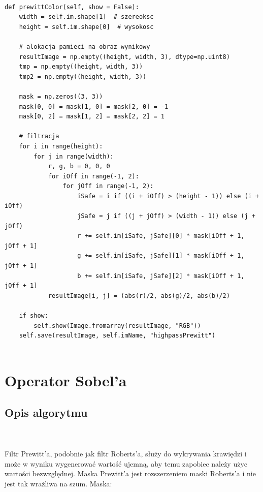 \documentclass[final,a4paper,openany,12pt]{mwbk}
\begin{document}
\newpage


\begin{lstlisting}[caption=Operator Prewitt'a (obraz barwny)]
	
def prewittColor(self, show = False):
	width = self.im.shape[1]  # szereoksc
	height = self.im.shape[0]  # wysokosc
	
	# alokacja pamieci na obraz wynikowy
	resultImage = np.empty((height, width, 3), dtype=np.uint8)
	tmp = np.empty((height, width, 3))
	tmp2 = np.empty((height, width, 3))
	
	mask = np.zeros((3, 3))
	mask[0, 0] = mask[1, 0] = mask[2, 0] = -1
	mask[0, 2] = mask[1, 2] = mask[2, 2] = 1
	
	# filtracja
	for i in range(height):
		for j in range(width):
			r, g, b = 0, 0, 0
			for iOff in range(-1, 2):
				for jOff in range(-1, 2):
					iSafe = i if ((i + iOff) > (height - 1)) else (i + iOff)
					jSafe = j if ((j + jOff) > (width - 1)) else (j + jOff)
					r += self.im[iSafe, jSafe][0] * mask[iOff + 1, jOff + 1]
					g += self.im[iSafe, jSafe][1] * mask[iOff + 1, jOff + 1]
					b += self.im[iSafe, jSafe][2] * mask[iOff + 1, jOff + 1]
			resultImage[i, j] = (abs(r)/2, abs(g)/2, abs(b)/2)
	
	if show:
		self.show(Image.fromarray(resultImage, "RGB"))
	self.save(resultImage, self.imName, "highpassPrewitt")
	
\end{lstlisting}

\newpage

\section{Operator Sobel'a}
\subsection*{Opis algorytmu}
\hfill
\\\\
\indent Filtr Prewitt'a, podobnie jak filtr Roberts'a, służy do wykrywania krawiędzi i może w wyniku wygenerować wartość ujemną, aby temu zapobiec należy użyc wartości bezwzględnej. Maska Prewitt'a jest rozszerzeniem maski Roberts'a i nie jest tak wrażliwa na szum. Maska:
\end{document}
